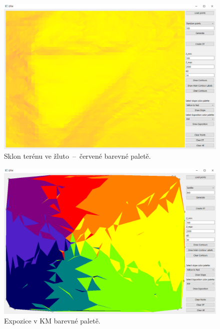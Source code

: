 \documentclass[a4paper, 12pt, oneside, titlepage]{article} %
\begin{document}
\begin{figure}[!htb]
	\centering
	\includegraphics[scale=0.45]{obrazky/sklon_yr.png} 
	\caption{Sklon terénu ve žluto~--~červené barevné paletě.
	}
	\label{fig:sklon_yr}
\end{figure} 
\FloatBarrier

\begin{figure}[!htb]
	\centering
	\includegraphics[scale=0.45]{obrazky/exp_km.png} 
	\caption{Expozice v KM barevné paletě.
	}
	\label{fig:exp_km}
\end{figure} 
\FloatBarrier
\end{document}
